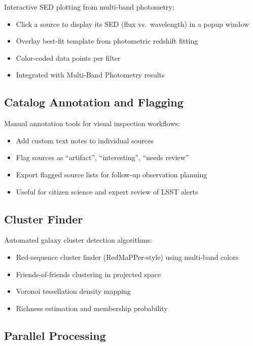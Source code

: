 \documentclass[11pt,fleqn]{book}
\begin{document}
Interactive SED plotting from multi-band photometry:
\begin{itemize}[leftmargin=2em]
  \item Click a source to display its SED (flux vs.\ wavelength) in a popup window
  \item Overlay best-fit template from photometric redshift fitting
  \item Color-coded data points per filter
  \item Integrated with Multi-Band Photometry results
\end{itemize}

\subsection{Catalog Annotation and Flagging}

Manual annotation tools for visual inspection workflows:
\begin{itemize}[leftmargin=2em]
  \item Add custom text notes to individual sources
  \item Flag sources as ``artifact'', ``interesting'', ``needs review''
  \item Export flagged source lists for follow-up observation planning
  \item Useful for citizen science and expert review of LSST alerts
\end{itemize}

\subsection{Cluster Finder}

Automated galaxy cluster detection algorithms:
\begin{itemize}[leftmargin=2em]
  \item Red-sequence cluster finder (RedMaPPer-style) using multi-band colors
  \item Friends-of-friends clustering in projected space
  \item Voronoi tessellation density mapping
  \item Richness estimation and membership probability
\end{itemize}

\subsection{Parallel Processing}
\end{document}
